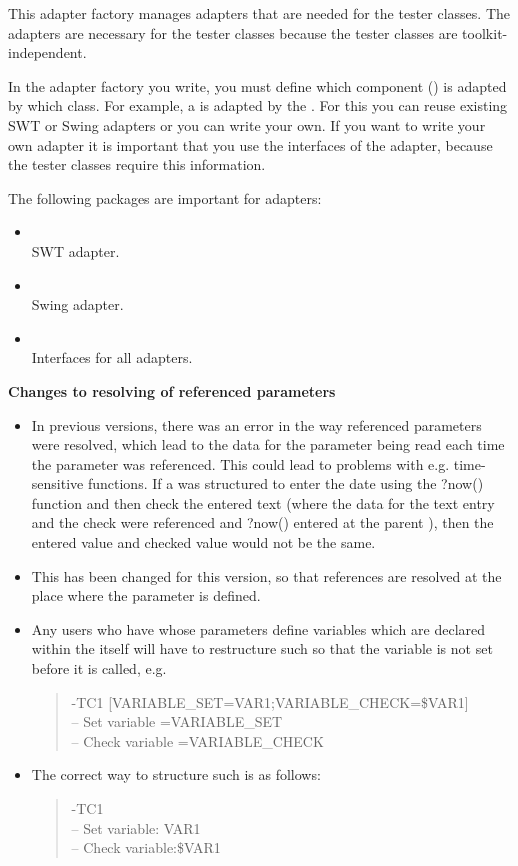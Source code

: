 This adapter factory manages adapters that are needed for the tester classes. The adapters are necessary for the tester classes because the tester classes are toolkit-independent.

In the adapter factory you write, you must define which component () is adapted by which class. For example, a  is adapted by the . For this you can reuse existing SWT or Swing adapters or you can write your own. If you want to write your own adapter it is important that you use the \app{} interfaces of the adapter, because the tester classes require this information.  

The following packages are important for adapters:
\begin{itemize}
\item {}\\ SWT adapter.
\item {}\\ Swing adapter.
\item {}\\Interfaces for all adapters.
\end{itemize}

\textbf{Changes to resolving of referenced parameters}\\
\begin{itemize}
\item In previous versions, there was an error in the way referenced parameters were resolved, which lead to the data for the parameter being read each time the parameter was referenced. This could lead to problems with e.g. time-sensitive functions. If a \gdcase{} was structured to enter the date using the ?now() function and then check the entered text (where the data for the text entry and the check were referenced and ?now() entered at the parent \gdcase{}), then the entered value and checked value would not be the same.
\item This has been changed for this version, so that references are resolved at the place where the parameter is defined. 
\item Any users who have \gdcases{} whose parameters define variables which are declared within the \gdcase{} itself will have to restructure such \gdcases{} so that the variable is not set before it is called, e.g.
\begin{quote}
-TC1 [VARIABLE\_SET=VAR1;VARIABLE\_CHECK=\$VAR1]\\
-- Set variable =VARIABLE\_SET\\
-- Check variable =VARIABLE\_CHECK
\end{quote}
\item The correct way to structure such \gdcases{} is as follows:
\begin{quote}
-TC1\\
-- Set variable: VAR1\\
-- Check variable:\$VAR1
\end{quote}
\end{itemize}

